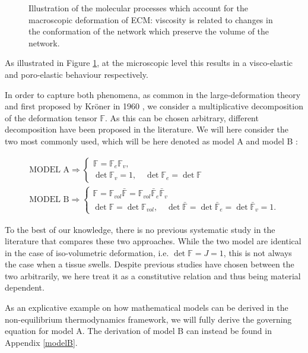 \documentclass[runningheads]{llncs}
\newcommand{\F}{\ensuremath{\mathbb{F}}}
\begin{document}
\begin{figure}[h!]
	\def\svgwidth{1.0\linewidth}
	
	\caption{Illustration of the molecular processes which account for the macroscopic deformation of ECM: viscosity is related to changes in the conformation of the network which preserve the volume of the network.}
	\label{deformation}
\end{figure}
As illustrated in Figure \ref{deformation}, at the microscopic level this results in a visco-elastic and poro-elastic behaviour respectively.

In order to capture both phenomena, as common in the large-deformation theory \cite{Article1,CACCAVO2,Plasto,magneto,NGUYEN,growthtum} and first proposed by Kr\"{o}ner in 1960 \cite{kro}, we consider a multiplicative decomposition of the deformation tensor $\F$. As this can be chosen arbitrary, different decomposition have been proposed in the literature. We will here consider the two most commonly used, which will be here denoted as model A \cite{Article1,CACCAVO2,Plasto} and model B \cite{magneto,NGUYEN,Jeru}:

\begin{gather}
\text{MODEL A} \Rightarrow\begin{cases}
\F=\F_e\F_v,\\
\det\F_v=1, \quad \det\F_e=\det\F
\end{cases} \label{dec1}\tag{A}\\[4pt]
\text{MODEL B} \Rightarrow\begin{cases}
\F= \F_{vol}\bar{\F}=\F_{vol}\bar{\F}_e\bar{\F}_v\\
\det\F=\det\F_{vol},\quad \det\bar{\F}=\det\bar{\F}_e=\det\bar{\F}_v=1.\label{dec2}
\end{cases}\tag{B}
\end{gather}

To the best of our knowledge, there is no previous systematic study in the literature that compares these two approaches. While the two model are identical in the case of iso-volumetric deformation, i.e. $\det \F=J=1$, this is not always the case when a tissue swells. Despite previous studies have chosen between the two arbitrarily, we here treat it as a constitutive relation and thus being material dependent.

As an explicative example on how mathematical models can be derived in the non-equilibrium thermodynamics framework, we will fully derive the governing equation for model A. The derivation of model B can instead be found in Appendix \ref{modelB}. 
\end{document}
